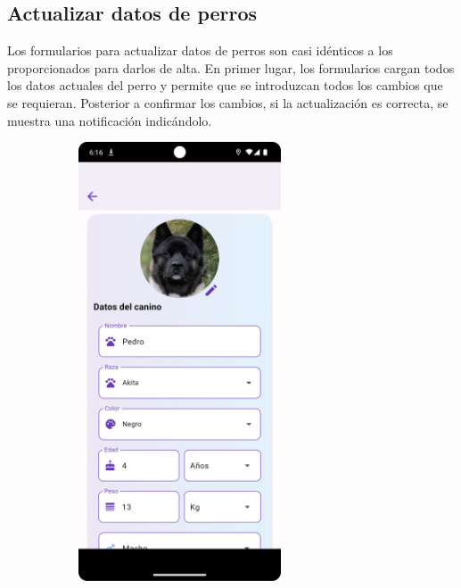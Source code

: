 \documentclass[a4paper, 12pt]{article}
\begin{document}
\newpage
\subsection*{Actualizar datos de perros}

Los formularios para actualizar datos de perros son casi idénticos a los proporcionados para darlos de alta. En primer lugar, los formularios cargan todos los datos actuales del perro y permite que se introduzcan todos los cambios que se requieran. Posterior a confirmar los cambios, si la actualización es correcta, se muestra una notificación indicándolo.

\begin{figure}[H]
   	\begin{subfigure}{0.48\textwidth}
		\begin{center}
			{\includegraphics[width=6cm]{app/DogUpdate.png}\par}
		\end{center}  
	\end{subfigure}\hfill
   	\begin{subfigure}{0.48\textwidth}
		\begin{center}

\end{center}
\end{subfigure}
\end{figure}
\end{document}
